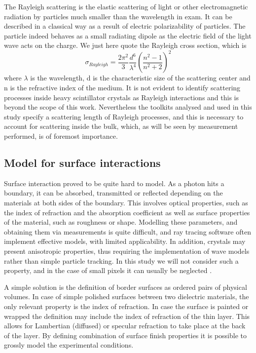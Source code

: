 The Rayleigh scattering is the elastic scattering of light or other electromagnetic radiation by particles much smaller than the wavelength in exam.
It can be described in a classical way as a result of electric polarizability of particles.
The particle indeed behaves as a small radiating dipole as the electric field of the light wave acts on the charge. We just here quote the Rayleigh cross section, which is 
\begin{equation}
\sigma _{Rayleigh} = \frac{2\pi ^{2}}{3} \frac{d^{6}}{\lambda ^{4}}\left( \frac{n^{2}-1}{n^{2}+2} \right) ^{2}
\end{equation}
where $\lambda$ is the wavelength, d is the characteristic size of the scattering center and n is the refractive index of the medium.
It is not evident to identify scattering processes inside heavy scintillator crystals as Rayleigh interactions and this is beyond the scope of this work. Nevertheless the toolkits analysed and used in this study specify a scattering length of Rayleigh processes, and this is necessary to account for scattering inside the bulk, which, as will be seen by measurement performed, is of foremost importance.

\subsection{Model for surface interactions}
Surface interaction proved to be quite hard to model. As a photon hits a boundary, it can be absorbed, transmitted or reflected depending on the  materials at both sides of the boundary. This involves optical properties, such as the index of refraction and the absorption coefficient as well as surface properties of the material, such as roughness or shape.
Modelling these parameters, and obtaining them via measurements is quite difficult, and ray tracing software often implement effective models, with limited applicability.
In addition, crystals may present anisotropic properties, thus requiring the implementation of wave models rather than simple particle tracking.
In this study we will not consider such a property, and in the case of small pixels it can usually be neglected \cite{Cuccia2013}.

A simple solution is the definition of border surfaces as ordered pairs of physical volumes. In case of simple polished surfaces between two dielectric materials, the only relevant property is the index of refraction.
In case the surface is painted or wrapped the definition may include the index of refraction of the thin layer. This allows for Lambertian (diffused) or specular refraction to take place at the back of the layer. By defining combination of surface finish properties it is possible to grossly model the experimental conditions.

